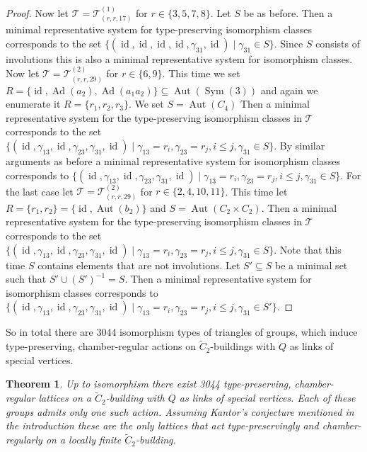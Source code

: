 \documentclass[dvipsnames]{article}
\newtheorem{theorem}{Theorem}
\theoremstyle{definition}
\theoremstyle{remark}
\DeclareMathOperator{\Sym}{Sym}
\DeclareMathOperator{\Aut}{Aut}
\DeclareMathOperator{\id}{id}
\DeclareMathOperator{\Ad}{Ad}
\begin{document}
\begin{proof}
        Now let $\mathcal T = \mathcal T^{(1)}_{(r,r,17)}$ for $r \in \{3,5,7,8\}$. Let $S$ be as before. Then a minimal representative system for type-preserving isomorphism classes corresponds to the set
        $\{(\id,\id,\id,\id,\gamma_{31},\id) \mid \gamma_{31} \in S\}$. Since $S$ consists of involutions this is also a minimal representative system for isomorphism classes.
        Now let $\mathcal T = \mathcal T^{(2)}_{(r,r,29)}$ for $r \in \{6,9\}$. This time we set $R = \{\id, \Ad(a_2), \Ad(a_1a_2)\} \subseteq \Aut(\Sym(3))$ and again we enumerate it $R=\{r_1, r_2, r_3\}$. We set $S = \Aut(C_4)$ Then a minimal representative system for the type-preserving isomorphism classes in $\mathcal T$ corresponds to the set $\{(\id,\gamma_{13},\id,\gamma_{23}, \gamma_{31},\id) \mid \gamma_{13} = r_i, \gamma_{23} = r_j, i \leq j, \gamma_{31} \in S\}$. By similar arguments as before a minimal representative system for isomorphism classes corresponds to $\{(\id,\gamma_{13},\id,\gamma_{23}, \gamma_{31},\id) \mid \gamma_{13} = r_i, \gamma_{23} = r_j, i \leq j, \gamma_{31} \in S\}$.
        For the last case let $\mathcal T = \mathcal T^{(2)}_{(r,r,29)}$ for $r \in \{2,4,10,11\}$. This time let $R = \{ {r_1, r_2} \}=\{\id, \Aut(b_2)\}$ and $S = \Aut(C_2\times C_2)$. Then a minimal representative system for the type-preserving isomorphism classes in $\mathcal T$ corresponds to the set $\{(\id,\gamma_{13},\id,\gamma_{23}, \gamma_{31},\id) \mid \gamma_{13} = r_i, \gamma_{23} = r_j, i \leq j, \gamma_{31} \in S\}$. Note that this time $S$ contains elements that are not involutions. Let $S' \subseteq S$ be a minimal set such that $S' \cup (S')^{-1} = S$. Then a minimal representative system for isomorphism classes corresponds to $\{(\id,\gamma_{13},\id,\gamma_{23}, \gamma_{31},\id) \mid \gamma_{13} = r_i, \gamma_{23} = r_j, i \leq j, \gamma_{31} \in S'\}$. 
    \end{proof}

    So in total there are 3044 isomorphism types of triangles of groups, which induce type-preserving, chamber-regular actions on $\tilde C_2$-buildings with $Q$ as links of special vertices.

    \begin{theorem}
        Up to isomorphism there exist 3044 type-preserving, chamber-regular lattices on a $\tilde C_2$-building with $Q$ as links of special vertices. Each of these groups admits only one such action. Assuming Kantor's conjecture mentioned in the introduction these are the only lattices that act type-preservingly and chamber-regularly on a locally finite $\tilde C_2$-building.
    \end{theorem}
\end{document}

